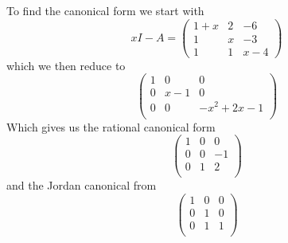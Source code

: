 \documentclass[10pt]{article}
\newcommand{\sk}{\vskip 10mm}
\theoremstyle{plain}
\theoremstyle{remark}
\begin{document}
To find the canonical form we start with
\[ xI-A = 
  \left(
    \begin{array}{ccc}
      1+x&2&-6\\
      1&x&-3\\
      1&1&x-4
    \end{array}
  \right)\]
which we then reduce to
\[
  \left(
    \begin{array}{ccc}
      1&0&0\\
      0&x-1&0\\
      0&0&-x^2+2x-1\\
    \end{array}
  \right)
\]
Which gives us the rational canonical form
\[
  \left(
    \begin{array}{ccc}
      1&0&0\\
      0&0&-1\\
      0&1&2\\
    \end{array}
  \right)
\]
and the Jordan canonical from
\[
  \left(
    \begin{array}{ccc}
      1&0&0\\
      0&1&0\\
      0&1&1\\
    \end{array}
  \right)
\]

\sk

\end{document}
